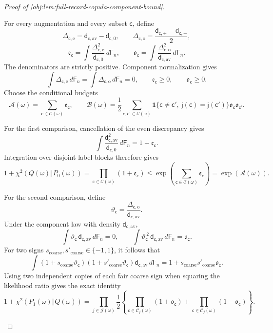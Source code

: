 \begin{proof}[Proof of \cref{obj:lem:full-record-copula-component-bound}]
\begin{enumerate}
For every augmentation and every subset \(\mathsf c\), define
\[
\Delta_{\mathsf c,\mathrm e}
 =\mathsf d_{\mathsf c,\mathrm{av}}-\mathsf d_{\mathsf c,0},
\qquad
\Delta_{\mathsf c,\mathrm o}
 =\frac{\mathsf d_{\mathsf c,+}-\mathsf d_{\mathsf c,-}}2,
\]
\[
\mathfrak e_{\mathsf c}
 =\int\frac{\Delta_{\mathsf c,\mathrm e}^2}
                 {\mathsf d_{\mathsf c,0}}\,d\mathsf F_n,
\qquad
\mathfrak o_{\mathsf c}
 =\int\frac{\Delta_{\mathsf c,\mathrm o}^2}
                 {\mathsf d_{\mathsf c,\mathrm{av}}}\,d\mathsf F_n.
\]
The denominators are strictly positive. Component normalization gives
\[
\int\Delta_{\mathsf c,\mathrm e}\,d\mathsf F_n
 =\int\Delta_{\mathsf c,\mathrm o}\,d\mathsf F_n=0,
\qquad
\mathfrak e_{\mathsf c}\ge0,\qquad
\mathfrak o_{\mathsf c}\ge0.
\]
Choose the conditional budgets
\[
\mathcal A(\omega)
 =\sum_{\mathsf c\in\mathscr C(\omega)}
       \mathfrak e_{\mathsf c},
\qquad
\mathcal B(\omega)
 =\frac12
   \sum_{\mathsf c,\mathsf c'\in\mathscr C(\omega)}
   \mathbf1\{\mathsf c\ne\mathsf c',\
             \mathsf j(\mathsf c)=\mathsf j(\mathsf c')\}
       \mathfrak o_{\mathsf c}\mathfrak o_{\mathsf c'}.
\]

For the first comparison, cancellation of the even discrepancy gives
\[
\int
 \frac{\mathsf d_{\mathsf c,\mathrm{av}}^2}
      {\mathsf d_{\mathsf c,0}}\,d\mathsf F_n
 =1+\mathfrak e_{\mathsf c}.
\]
Integration over disjoint label blocks therefore gives
\[
1+\chi^2(Q(\omega)\Vert P_0(\omega))
 =\prod_{\mathsf c\in\mathscr C(\omega)}
      (1+\mathfrak e_{\mathsf c})
 \le\exp\!\left(
       \sum_{\mathsf c\in\mathscr C(\omega)}
          \mathfrak e_{\mathsf c}\right)
 =\exp(\mathcal A(\omega)).
\]

For the second comparison, define
\[
\vartheta_{\mathsf c}
 =\frac{\Delta_{\mathsf c,\mathrm o}}
        {\mathsf d_{\mathsf c,\mathrm{av}}}.
\]
Under the component law with density
\(\mathsf d_{\mathsf c,\mathrm{av}}\),
\[
\int\vartheta_{\mathsf c}\,
       \mathsf d_{\mathsf c,\mathrm{av}}\,d\mathsf F_n=0,
\qquad
\int\vartheta_{\mathsf c}^{\,2}\,
       \mathsf d_{\mathsf c,\mathrm{av}}\,d\mathsf F_n
 =\mathfrak o_{\mathsf c}.
\]
For two signs \(s_{\mathrm{coarse}},s'_{\mathrm{coarse}}\in\{-1,1\}\), it follows that
\[
\int
 (1+s_{\mathrm{coarse}}\vartheta_{\mathsf c})
 (1+s'_{\mathrm{coarse}}\vartheta_{\mathsf c})
 \mathsf d_{\mathsf c,\mathrm{av}}\,d\mathsf F_n
 =
 1+s_{\mathrm{coarse}}s'_{\mathrm{coarse}}
       \mathfrak o_{\mathsf c}.
\]
Using two independent copies of each fair coarse sign when squaring the likelihood ratio gives the exact identity
\[
1+\chi^2(P_1(\omega)\Vert Q(\omega))
 =
 \prod_{j\in\mathscr J(\omega)}
 \frac12\left\{
 \prod_{\mathsf c\in\mathscr C_j(\omega)}
      (1+\mathfrak o_{\mathsf c})
 +
 \prod_{\mathsf c\in\mathscr C_j(\omega)}
      (1-\mathfrak o_{\mathsf c})
 \right\}.
\]


\end{enumerate}
\end{proof}
